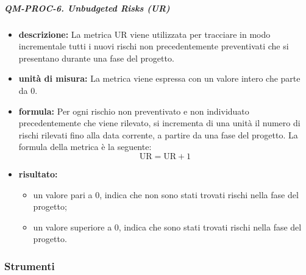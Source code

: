 			\subparagraph{QM-PROC-6. Unbudgeted Risks (UR)}
			\begin{itemize}
				\item \textbf{descrizione: }
				La metrica UR viene utilizzata per tracciare in modo incrementale tutti i nuovi rischi non precedentemente preventivati che si presentano durante una fase del progetto. 

				\item \textbf{unità di misura: }
				La metrica viene espressa con un valore intero che parte da 0. 

				\item \textbf{formula: }
				Per ogni rischio non preventivato e non individuato precedentemente che viene rilevato, si incrementa di una unità il numero di rischi rilevati fino alla data corrente, a partire da una fase del progetto.
				La formula della metrica è la seguente:
				\[
					\text{UR} = \text{UR} + 1
				\]
				
				\item \textbf{risultato: }
				\begin{itemize}
					\item un valore pari a 0, indica che non sono stati trovati rischi nella fase del progetto;
					\item un valore superiore a 0, indica che sono stati trovati rischi nella fase del progetto.
				\end{itemize}		
			\end{itemize}

	\subsubsection{Strumenti}


